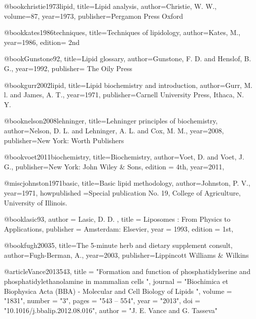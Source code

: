 @book{christie1973lipid,
	title={Lipid analysis},
	author={Christie, W. W.},
	volume={87},
	year={1973},
	publisher={Pergamon Press Oxford}
}

@book{kates1986techniques,
	title={Techniques of lipidology},
	author={Kates, M.},
	year={1986},
	edition= {2nd}
}


@book{Gunstone92,
	title={Lipid glossary},
	author={Gunstone, F. D. and Henslof, B. G.},
	year={1992},
	publisher= {The Oily Press}
}


@book{gurr2002lipid,
	title={Lipid biochemistry and introduction},
	author={Gurr, M. l. and James, A. T.},
	year={1971},
	publisher={Carnell University Press, Ithaca, N. Y.}
}


@book{nelson2008lehninger,
  title={Lehninger principles of biochemistry},
  author={Nelson, D.  L.  and Lehninger, A. L.  and Cox, M.  M.},
  year={2008},
  publisher={New York: Worth Publishers}
}


@book{voet2011biochemistry,
	title={Biochemistry},
	author={Voet, D. and Voet, J. G.},
	publisher={New York: John Wiley \& Sons},
	edition = {4th},
	year={2011},
}

@misc{johnston1971basic,
	title={Basic lipid methodology},
	author={Johnston, P.  V.},
	year={1971},
	howpublished ={Special publication No. 19, College of
	Agriculture, University of Illinois.}
	}

@book{lasic93,
	author = {Lasic, D. D. },
	title = {Liposomes : From Physics to Applications},
	publisher = {Amsterdam: {E}lsevier},
	year = {1993},
	edition = {1st},
}

@book{fugh20035,
	title={The 5-minute herb and dietary supplement consult},
	author={Fugh-Berman,  A.},
	year={2003},
	publisher={Lippincott  Williams \&  Wilkins}
}

@article{Vance2013543,
	title = "Formation and function of phosphatidylserine and phosphatidylethanolamine in mammalian cells ",
	journal = "Biochimica et Biophysica Acta {(BBA)} - Molecular and Cell Biology of Lipids ",
	volume = "1831",
	number = "3",
	pages = "543 -- 554",
	year = "2013",
	doi = "10.1016/j.bbalip.2012.08.016",
	author = "J. E. Vance and G.  Tasseva"
}